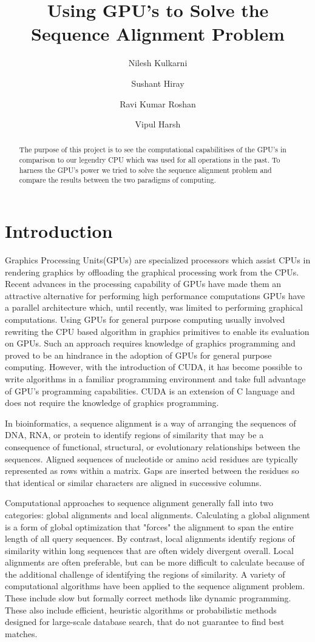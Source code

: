 \documentclass[a4paper,11pt]{report}
\title{Using GPU's to Solve the Sequence Alignment Problem }
\author{Nilesh Kulkarni \and Sushant Hiray \and Ravi Kumar Roshan \and Vipul Harsh}
\begin{document}
\maketitle
\tableofcontents

\begin{abstract}
The purpose of this project is to see the computational capabilitises of the GPU's in comparison to our legendry CPU which was used for all operations in the past. To harness the GPU's power we tried to solve the sequence alignment problem and compare the results between the two paradigms of computing.
\end{abstract}


\chapter{Introduction}
Graphics Processing Units(GPUs) are specialized processors which assist CPUs in rendering graphics by offloading the graphical processing work from the CPUs. Recent advances in the processing capability of GPUs have made them an attractive alternative for performing high performance computations GPUs have a parallel architecture which, until recently, was limited to performing graphical computations. Using GPUs for general purpose computing usually involved rewriting the CPU based algorithm in graphics primitives to enable its evaluation on GPUs. Such an approach requires knowledge of graphics programming and proved to be an hindrance in the adoption of GPUs for general purpose computing. However, with the introduction of CUDA, it has become possible to write algorithms in a familiar programming environment and take full advantage of GPU’s programming capabilities. CUDA is an extension of C language and does not require the knowledge of graphics programming.

In bioinformatics, a sequence alignment is a way of arranging the sequences of DNA, RNA, or protein to identify regions of similarity that may be a consequence of functional, structural, or evolutionary relationships between the sequences. Aligned sequences of nucleotide or amino acid residues are typically represented as rows within a matrix. Gaps are inserted between the residues so that identical or similar characters are aligned in successive columns.

Computational approaches to sequence alignment generally fall into two categories: global alignments and local alignments. Calculating a global alignment is a form of global optimization that "forces" the alignment to span the entire length of all query sequences. By contrast, local alignments identify regions of similarity within long sequences that are often widely divergent overall. Local alignments are often preferable, but can be more difficult to calculate because of the additional challenge of identifying the regions of similarity. A variety of computational algorithms have been applied to the sequence alignment problem. These include slow but formally correct methods like dynamic programming. These also include efficient, heuristic algorithms or probabilistic methods designed for large-scale database search, that do not guarantee to find best matches.
\end{document}
